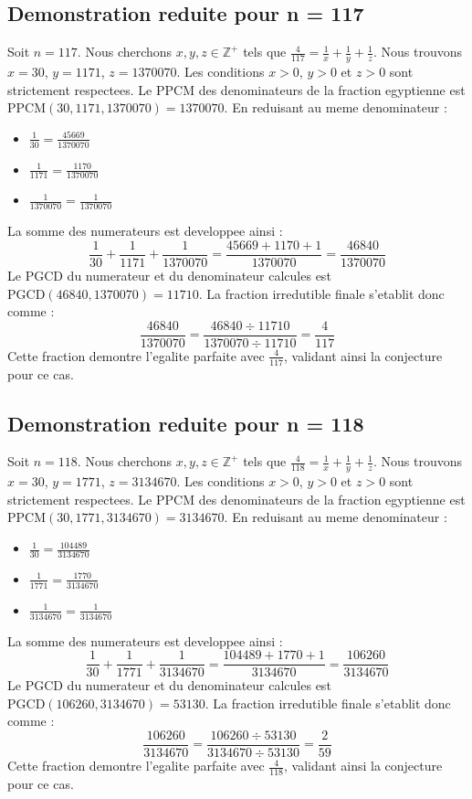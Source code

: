 \documentclass[11pt,a4paper]{article}
\begin{document}
\subsection{Demonstration reduite pour n = 117}
Soit $n = 117$. Nous cherchons $x, y, z \in \mathbb{Z}^{+}$ tels que $\frac{4}{117} = \frac{1}{x} + \frac{1}{y} + \frac{1}{z}$.
Nous trouvons $x = 30$, $y = 1171$, $z = 1370070$.
Les conditions $x > 0$, $y > 0$ et $z > 0$ sont strictement respectees.
Le PPCM des denominateurs de la fraction egyptienne est $\text{PPCM}(30, 1171, 1370070) = 1370070$.
En reduisant au meme denominateur :
\begin{itemize}
    \item $\frac{1}{30} = \frac{45669}{1370070}$
    \item $\frac{1}{1171} = \frac{1170}{1370070}$
    \item $\frac{1}{1370070} = \frac{1}{1370070}$
\end{itemize}
La somme des numerateurs est developpee ainsi :
$$ \frac{1}{30} + \frac{1}{1171} + \frac{1}{1370070} = \frac{45669 + 1170 + 1}{1370070} = \frac{46840}{1370070} $$
Le PGCD du numerateur et du denominateur calcules est $\text{PGCD}(46840, 1370070) = 11710$.
La fraction irredutible finale s'etablit donc comme :
$$ \frac{46840}{1370070} = \frac{46840 \div 11710}{1370070 \div 11710} = \frac{4}{117} $$
Cette fraction demontre l'egalite parfaite avec $\frac{4}{117}$, validant ainsi la conjecture pour ce cas.

\subsection{Demonstration reduite pour n = 118}
Soit $n = 118$. Nous cherchons $x, y, z \in \mathbb{Z}^{+}$ tels que $\frac{4}{118} = \frac{1}{x} + \frac{1}{y} + \frac{1}{z}$.
Nous trouvons $x = 30$, $y = 1771$, $z = 3134670$.
Les conditions $x > 0$, $y > 0$ et $z > 0$ sont strictement respectees.
Le PPCM des denominateurs de la fraction egyptienne est $\text{PPCM}(30, 1771, 3134670) = 3134670$.
En reduisant au meme denominateur :
\begin{itemize}
    \item $\frac{1}{30} = \frac{104489}{3134670}$
    \item $\frac{1}{1771} = \frac{1770}{3134670}$
    \item $\frac{1}{3134670} = \frac{1}{3134670}$
\end{itemize}
La somme des numerateurs est developpee ainsi :
$$ \frac{1}{30} + \frac{1}{1771} + \frac{1}{3134670} = \frac{104489 + 1770 + 1}{3134670} = \frac{106260}{3134670} $$
Le PGCD du numerateur et du denominateur calcules est $\text{PGCD}(106260, 3134670) = 53130$.
La fraction irredutible finale s'etablit donc comme :
$$ \frac{106260}{3134670} = \frac{106260 \div 53130}{3134670 \div 53130} = \frac{2}{59} $$
Cette fraction demontre l'egalite parfaite avec $\frac{4}{118}$, validant ainsi la conjecture pour ce cas.
\end{document}
